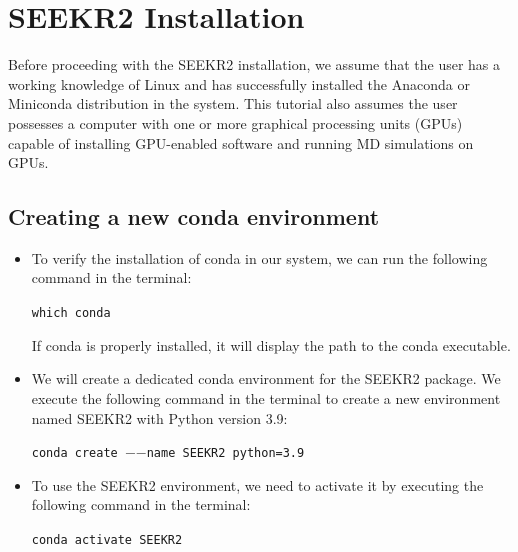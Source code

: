 \documentclass[9pt,training,pubversion]{livecoms}
\begin{document}
\section{SEEKR2 Installation}

\vspace{2mm}

\noindent Before proceeding with the SEEKR2 installation, we assume that the user has a working knowledge of Linux and has successfully installed the Anaconda or Miniconda distribution in the system. This tutorial also assumes the user possesses a computer with one or more graphical processing units (GPUs) capable of installing GPU-enabled software and running MD simulations on GPUs.

\subsection{Creating a new conda environment}
\vspace{2mm}
\begin{itemize} 

\item To verify the installation of conda in our system, we can run the following command in the terminal: 
\begin{tcolorbox}[colback=black!8!white, colframe=black!50!black, fontlower=\tiny, left=2pt, right=2pt, top=2pt, bottom=2pt] 
\texttt{which conda}
\end{tcolorbox}

If conda is properly installed, it will display the path to the conda executable.

\item We will create a dedicated conda environment for the SEEKR2 package. We execute the following command in the terminal to create a new environment named SEEKR2 with Python version 3.9:

\begin{tcolorbox}[colback=black!8!white, colframe=black!50!black, fontlower=\tiny, left=2pt, right=2pt, top=2pt, bottom=2pt] 
\texttt{conda create $-$$-$name SEEKR2 python=3.9}
\end{tcolorbox}

\item To use the SEEKR2 environment, we need to activate it by executing the following command in the terminal:

\begin{tcolorbox}[colback=black!8!white, colframe=black!50!black, fontlower=\tiny, left=2pt, right=2pt, top=2pt, bottom=2pt] 
\texttt{conda activate SEEKR2}
\end{tcolorbox}

\end{itemize}
\end{document}
